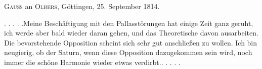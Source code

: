 \par{}\bigskip
\begin{center}
\textsc{Gauss} an \textsc{Olbers}, Göttingen, 25. September 1814.
\end{center}
\noindent\hspace*{\parindent}. . . . .\quad Meine Beschäftigung mit den Pallasstörungen hat einige Zeit ganz geruht, ich werde aber bald wieder daran gehen, und das Theoretische davon ausarbeiten. Die bevorstehende Opposition scheint sich sehr gut anschließen zu wollen. Ich bin neugierig, ob der Saturn, wenn diese Opposition dazugekommen sein wird, noch immer die schöne Harmonie wieder etwas verdirbt.\quad . . . . .
\par
